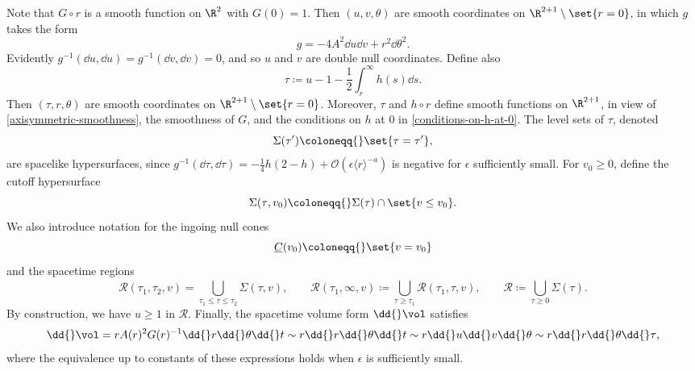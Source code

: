 \documentclass[10pt, reqno]{amsart}
\begin{document}
Note that \(G\circ r\) is a smooth function on \(\R^2\) with \(G(0) = 1\). Then
\((u,v,\theta{})\) are smooth coordinates on \(\R^{2 + 1}\setminus \set{r=0}\),
in which \(g\) takes the form
\begin{equation}\label{metric-double-null}
g = -4A^2\dd{}u\dd{}v + r^2\dd{}\theta^2.
\end{equation}
Evidently \(g^{-1}(\dd{}u,\dd{}u) = g^{-1}(\dd{}v,\dd{}v) = 0\), and so \(u\) and \(v\) are
double null coordinates. Define also
\begin{equation}\label{tau-def}
\tau{} \coloneqq{} u - 1 - \frac{1}{2}\int_r^\infty h(s)\dd{}s.
\end{equation}
Then \((\tau{},r,\theta{})\) are smooth coordinates on \(\R^{2 + 1}\setminus \set{r=0}\). Moreover,
\(\tau{}\) and \(h\circ r\) define smooth functions on \(\R^{2 + 1}\), in view
of \cref{axisymmetric-smoothness}, the smoothness of \(G\), and the conditions on \(h\) at \(0\) in
\cref{conditions-on-h-at-0}. The level sets of \(\tau{}\), denoted
\begin{equation}
\Sigma{}(\tau{}') \coloneqq{}\set{\tau{}=\tau{}'},
\end{equation}
are spacelike hypersurfaces, since \(g^{-1}(\dd{}\tau{},\dd{}\tau{}) = -\frac{1}{4}h(2-h) +
\mathcal{O}(\epsilon{}\langle{}r\rangle^{-a})\) is negative for \(\epsilon{}\)
sufficiently small. For \(v_0\ge 0\), define the cutoff hypersurface
\begin{equation}\label{sigma-tau-v}
\Sigma{}(\tau{},v_0)\coloneqq{}\Sigma{}(\tau{})\cap \set{v\le v_0}.
\end{equation}
We also introduce notation for the ingoing null cones
\begin{equation}
\underline{C}(v_0)\coloneqq{}\set{v=v_0}
\end{equation}
and the spacetime regions
\begin{equation}\label{spacetime-regions}
\mathcal{R}(\tau{}_1,\tau{}_2,v) = \bigcup_{\tau{}_1\le \tau{}\le \tau{}_2}^{}\Sigma{}(\tau{},v),\qquad \mathcal{R}(\tau{}_1,\infty,v)\coloneqq{}\bigcup_{\tau{}\ge \tau{}_1}^{}\mathcal{R}(\tau{}_1,\tau{},v),\qquad \mathcal{R}\coloneqq{}\bigcup_{\tau{}\ge 0}^{}\Sigma{}(\tau{}).
\end{equation}
By construction, we have \(u\ge 1\) in \(\mathcal{R}\). Finally, the spacetime volume form \(\dd{}\vol\) satisfies
\begin{equation}
\dd{}\vol = rA(r)^2G(r)^{-1}\dd{}r\dd{}\theta{}\dd{}t\sim r\dd{}r\dd{}\theta{}\dd{}t\sim r\dd{}u\dd{}v\dd{}\theta{}\sim r\dd{}r\dd{}\theta{}\dd{}\tau{},
\end{equation}
where the equivalence up to constants of these expressions holds when \(\epsilon{}\) is
sufficiently small.
\end{document}
